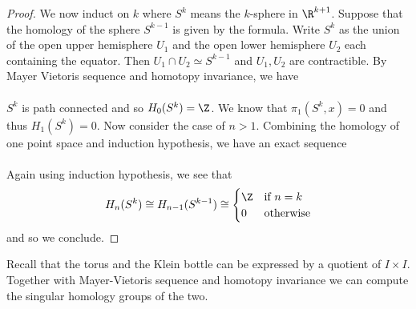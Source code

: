\documentclass[a4paper]{article}
\begin{document}
\begin{eg}{}{}
\begin{proof}
We now induct on $k$ where $S^k$ means the $k$-sphere in $\R^{k+1}$. Suppose that the homology of the sphere $S^{k-1}$ is given by the formula. Write $S^k$ as the union of the open upper hemisphere $U_1$ and the open lower hemisphere $U_2$ each containing the equator. Then $U_1\cap U_2\simeq S^{k-1}$ and $U_1,U_2$ are contractible. By Mayer Vietoris sequence and homotopy invariance, we have \\
\\
$S^k$ is path connected and so $H_0(S^k)=\Z$. We know that $\pi_1(S^k,x)=0$ and thus $H_1(S^k)=0$. Now consider the case of $n>1$. Combining the homology of one point space and induction hypothesis, we have an exact sequence \\
\\
Again using induction hypothesis, we see that $$H_n(S^k)\cong H_{n-1}(S^{k-1})\cong\begin{cases}
\Z & \text{if } n=k\\
0 & \text{otherwise}
\end{cases}$$
and so we conclude. 
\end{proof}
\end{eg}

Recall that the torus and the Klein bottle can be expressed by a quotient of $I\times I$. Together with Mayer-Vietoris sequence and homotopy invariance we can compute the singular homology groups of the two. 
\end{document}
